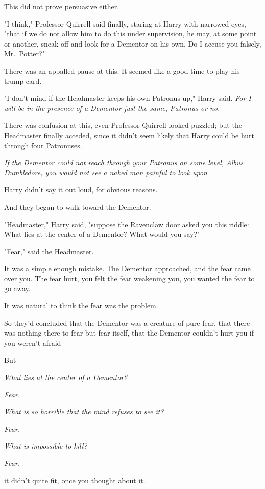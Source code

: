 This did not prove persuasive either.

"I think," Professor Quirrell said finally, staring at Harry with narrowed
eyes, "that if we do not allow him to do this under supervision, he may, at
some point or another, sneak off and look for a Dementor on his own. Do I
accuse you falsely, Mr.~Potter?"

There was an appalled pause at this. It seemed like a good time to play his
trump card.

"I don't mind if the Headmaster keeps his own Patronus up," Harry said.
\emph{For I will be in the presence of a Dementor just the same, Patronus or
no.}

There was confusion at this, even Professor Quirrell looked puzzled; but the
Headmaster finally acceded, since it didn't seem likely that Harry could be
hurt through four Patronuses.

\emph{If the Dementor could not reach through your Patronus on some level,
Albus Dumbledore, you would not see a naked man painful to look upon{\el}}

Harry didn't say it out loud, for obvious reasons.

And they began to walk toward the Dementor.

"Headmaster," Harry said, "suppose the Ravenclaw door asked you this riddle:
What lies at the center of a Dementor? What would you say?"

"Fear," said the Headmaster.

It was a simple enough mistake. The Dementor approached, and the fear came over
you. The fear hurt, you felt the fear weakening you, you wanted the fear to go
away.

It was natural to think the fear was the problem.

So they'd concluded that the Dementor was a creature of pure fear, that there
was nothing there to fear but fear itself, that the Dementor couldn't hurt you
if you weren't afraid{\el}

But{\el}

\emph{What lies at the center of a Dementor?}

\emph{Fear.}

\emph{What is so horrible that the mind refuses to see it?}

\emph{Fear.}

\emph{What is impossible to kill?}

\emph{Fear.}

{\el} it didn't quite fit, once you thought about it.

